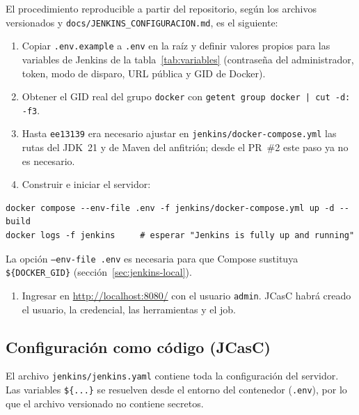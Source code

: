 \documentclass[11pt,a4paper]{article}
\newcommand{\ruta}[1]{\nolinkurl{#1}} %
\begin{document}
El procedimiento reproducible a partir del repositorio, según los archivos versionados y
\ruta{docs/JENKINS_CONFIGURACION.md}, es el siguiente:

\begin{enumerate}[noitemsep]
  \item Copiar \texttt{.env.example} a \texttt{.env} en la raíz y definir valores propios para las
        variables de Jenkins de la tabla~\ref{tab:variables} (contraseña del administrador, token,
        modo de disparo, URL pública y GID de Docker).
  \item Obtener el GID real del grupo \texttt{docker} con \texttt{getent group docker | cut -d: -f3}.
  \item Hasta \texttt{ee13139} era necesario ajustar en \ruta{jenkins/docker-compose.yml} las rutas
        del JDK~21 y de Maven del anfitrión; desde el PR~\#2 este paso ya no es necesario.
  \item Construir e iniciar el servidor:
\end{enumerate}
\begin{lstlisting}[language=shell]
docker compose --env-file .env -f jenkins/docker-compose.yml up -d --build
docker logs -f jenkins     # esperar "Jenkins is fully up and running"
\end{lstlisting}
{\small La opción \texttt{--env-file .env} es necesaria para que Compose sustituya
\texttt{\$\{DOCKER\_GID\}} (sección~\ref{sec:jenkins-local}).}
\begin{enumerate}
  \item Ingresar en \url{http://localhost:8080/} con el usuario \texttt{admin}. JCasC habrá creado el
        usuario, la credencial, las herramientas y el job.
\end{enumerate}

\subsection{Configuración como código (JCasC)}

El archivo \texttt{jenkins/jenkins.yaml} contiene toda la configuración del servidor. Las variables
\texttt{\$\{...\}} se resuelven desde el entorno del contenedor (\texttt{.env}), por lo que el
archivo versionado no contiene secretos.
\end{document}
